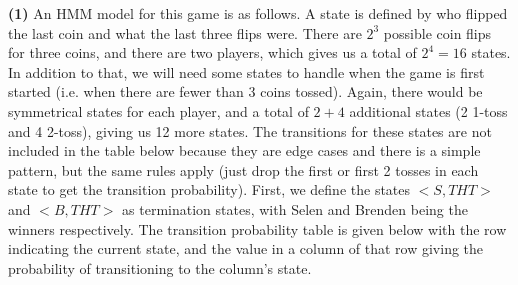 \documentclass[11pt]{article}
\renewcommand{\part}[1] {\vspace{.10in} {\bf (#1)}}
\begin{document}
\part{1}
An HMM model for this game is as follows. A state is defined by who flipped the last coin and what the last three flips were. There are $2^3$ possible coin flips for three coins, and there are two players, which gives us a total of $2^4 = 16$ states. In addition to that, we will need some states to handle when the game is first started (i.e. when there are fewer than 3 coins tossed). Again, there would be symmetrical states for each player, and a total of $2+4$ additional states (2 1-toss and 4 2-toss), giving us 12 more states. The transitions for these states are not included in the table below because they are edge cases and there is a simple pattern, but the same rules apply (just drop the first or first 2 tosses in each state to get the transition probability). First, we define the states $<S, THT>$ and $<B, THT>$ as termination states, with Selen and Brenden being the winners respectively. The transition probability table is given below with the row indicating the current state, and the value in a column of that row giving the probability of transitioning to the column's state. 
\end{document}
